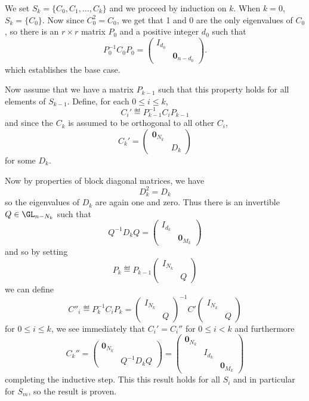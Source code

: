 \documentclass[12pt]{article}
\begin{document}
\begin{prf}
	We set $S_k=\{C_0,C_1,\dots,C_k\}$ and we proceed by induction on $k$. When $k=0$, $S_k=\{C_0\}$. Now since 
	$C_0^2=C_0$, we get that 1 and 0 are the only eigenvalues of $C_0$, so there is an $r\times r$ matrix $P_0$ 
	and a positive integer $d_0$ such that
	\[P_0^{-1}C_0P_0=\begin{pmatrix}
		I_{d_0} & \\
			& \mathbf{0}_{n-d_0}
	\end{pmatrix}.\]
	which establishes the base case.

	Now assume that we have a matrix $P_{k-1}$ such that this property holds for all elements of $S_{k-1}$.
	Define, for each $0\le i\le k$, 
	\[C_i'\eqdef P^{-1}_{k-1}C_iP_{k-1}\]
	and since the $C_k$ is assumed to be orthogonal to all other $C_i$,
	\[C_k'=\begin{pmatrix}
		\mathbf{0}_{N_k} & \\
		& D_k
	\end{pmatrix}\]
	for some $D_k$.

	Now by properties of block diagonal matrices, we have 
	\[D_k^2=D_k\]
	so the eigenvalues of $D_k$ are again one and zero. Thus there is an invertible $Q\in \GL_{n-N_k}$ such that 
	\[Q^{-1}D_kQ=\begin{pmatrix}I_{d_k} &\\ & \mathbf{0}_{M_k}\end{pmatrix}\]
	and so by setting
	\[P_k\eqdef P_{k-1}\begin{pmatrix}I_{N_k} &\\ & Q\end{pmatrix}\]
	we can define
	\[C''_i\eqdef P_k^{-1}C_i P_k=\begin{pmatrix}I_{N_k} &\\ & Q\end{pmatrix}^{-1}C'\begin{pmatrix}I_{N_k} &\\ & Q\end{pmatrix}\]
	for $0\le i\le k$, we see immediately that $C_i'=C_i''$ for $0\le i<k$ and furthermore 
	\[C_k''=\begin{pmatrix}
		\mathbf{0}_{N_k} & \\
		& Q^{-1}D_kQ
	\end{pmatrix}=\begin{pmatrix}
		\mathbf{0}_{N_k} & &\\
		& I_{d_k} & \\
		& & \mathbf{0}_{M_k}
	\end{pmatrix}\]
	completing the inductive step. This this result holds for all $S_i$ and in particular for $S_m$, so the result is proven.
\end{prf}
\end{document}
